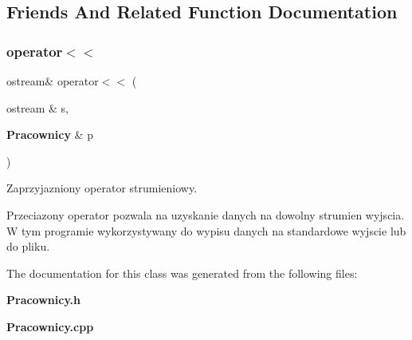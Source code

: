 \subsection{Friends And Related Function Documentation}
\mbox{\label{class_pracownicy_a982680671c2057a272ee1ab713a2fc5f}} 
\subsubsection{operator$<$$<$}
{\footnotesize\ttfamily ostream\& operator$<$$<$ (\begin{DoxyParamCaption}\item[{ostream \&}]{s,  }\item[{\textbf{ Pracownicy} \&}]{p }\end{DoxyParamCaption})\hspace{0.3cm}{\ttfamily [friend]}}



Zaprzyjazniony operator strumieniowy. 

Przeciazony operator pozwala na uzyskanie danych na dowolny strumien wyjscia. W tym programie wykorzystywany do wypisu danych na standardowe wyjscie lub do pliku. 

The documentation for this class was generated from the following files\+:\begin{DoxyCompactItemize}
\item 
\textbf{ Pracownicy.\+h}\item 
\textbf{ Pracownicy.\+cpp}\end{DoxyCompactItemize}
